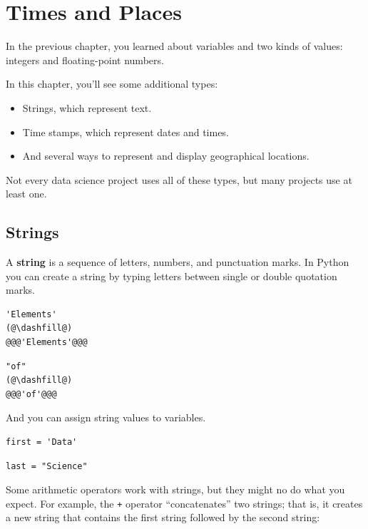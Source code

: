 \hypertarget{times-and-places}{%
\chapter{Times and Places}\label{times-and-places}}

In the previous chapter, you learned about variables and two kinds of
values: integers and floating-point numbers.

In this chapter, you'll see some additional types:

\begin{itemize}
\item
  Strings, which represent text.
\item
  Time stamps, which represent dates and times.
\item
  And several ways to represent and display geographical locations.
\end{itemize}

Not every data science project uses all of these types, but many
projects use at least one.

\hypertarget{strings}{%
\section{Strings}\label{strings}}

A \textbf{string} is a sequence of letters, numbers, and punctuation
marks. In Python you can create a string by typing letters between
single or double quotation marks.

\begin{lstlisting}[]
'Elements'
(@\dashfill@)
@@@'Elements'@@@
\end{lstlisting}

\begin{lstlisting}[]
"of"
(@\dashfill@)
@@@'of'@@@
\end{lstlisting}

And you can assign string values to variables.

\begin{lstlisting}[]
first = 'Data'
\end{lstlisting}

\begin{lstlisting}[]
last = "Science"
\end{lstlisting}

Some arithmetic operators work with strings, but they might no do what
you expect. For example, the \passthrough{\lstinline!+!} operator
``concatenates'' two strings; that is, it creates a new string that
contains the first string followed by the second string:

